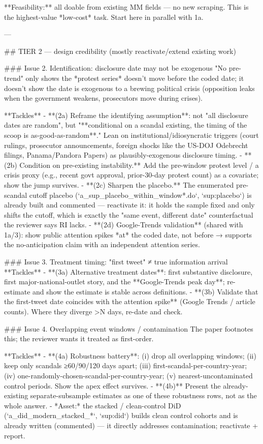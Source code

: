 **Feasibility:** all doable from existing MM fields — no new scraping. This is
the highest-value *low-cost* task. Start here in parallel with 1a.

---

## TIER 2 — design credibility (mostly reactivate/extend existing work)

### Issue 2. Identification: disclosure date may not be exogenous
"No pre-trend" only shows the *protest series* doesn't move before the coded
date; it doesn't show the date is exogenous to a brewing political crisis
(opposition leaks when the government weakens, prosecutors move during crises).

**Tackles**
- **(2a) Reframe the identifying assumption**: not "all disclosure dates are
  random", but "**conditional on a scandal existing, the timing of the scoop is
  as-good-as-random**." Lean on institutional/idiosyncratic triggers (court
  rulings, prosecutor announcements, foreign shocks like the US-DOJ Odebrecht
  filings, Panama/Pandora Papers) as plausibly-exogenous disclosure timing.
- **(2b) Condition on pre-existing instability.** Add the pre-window protest
  level / a crisis proxy (e.g., recent govt approval, prior-30-day protest count)
  as a covariate; show the jump survives.
- **(2c) Sharpen the placebo.** The enumerated pre-scandal cutoff placebo
  (`a_sup_placebo_within_window*.do`, `sup:placebo`) is already built and
  commented — reactivate it: it holds the sample fixed and only shifts the cutoff,
  which is exactly the "same event, different date" counterfactual the reviewer
  says RI lacks.
- **(2d) Google-Trends validation** (shared with 1a/3): show public attention
  spikes *at* the coded date, not before → supports the no-anticipation claim
  with an independent attention series.

### Issue 3. Treatment timing: "first tweet" ≠ true information arrival
**Tackles**
- **(3a) Alternative treatment dates**: first substantive disclosure, first
  major-national-outlet story, and the **Google-Trends peak day**; re-estimate and
  show the estimate is stable across definitions.
- **(3b) Validate that the first-tweet date coincides with the attention spike**
  (Google Trends / article counts). Where they diverge >N days, re-date and check.

### Issue 4. Overlapping event windows / contamination
The paper footnotes this; the reviewer wants it treated as first-order.

**Tackles**
- **(4a) Robustness battery**: (i) drop all overlapping windows; (ii) keep only
  scandals ≥60/90/120 days apart; (iii) first-scandal-per-country-year;
  (iv) one-randomly-chosen-scandal-per-country-year; (v) nearest-uncontaminated
  control periods. Show the apex effect survives.
- **(4b)** Present the already-existing separate-subsample estimates as one of
  these robustness rows, not as the whole answer.
- *Asset:* the stacked / clean-control DiD (`a_did_modern_stacked_*`, `sup:did`)
  builds clean control cohorts and is already written (commented) — it directly
  addresses contamination; reactivate + report.

